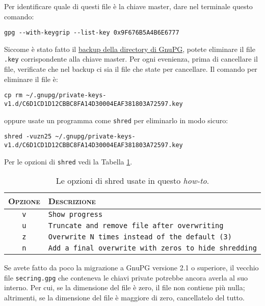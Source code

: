 \documentclass[a4paper,10pt]{article}
\begin{document}
Per identificare quale di questi file è la chiave master, dare nel terminale questo comando:

\begin{lstlisting}
gpg --with-keygrip --list-key 0x9F676B5A4B6E6777
\end{lstlisting}

Siccome è stato fatto il \hyperref[sec:backup-directory-gnupg]{backup della directory di GnuPG}, potete eliminare il file \texttt{.key} corrispondente alla chiave master. Per ogni evenienza, prima di cancellare il file, verificate che nel backup ci sia il file che state per cancellare. Il comando per eliminare il file è:

\begin{lstlisting}
cp rm ~/.gnupg/private-keys-v1.d/C6D1CD1D12CBBC8FA14D30004EAF381803A72597.key
\end{lstlisting}

oppure usate un programma come \texttt{shred} per eliminarlo in modo sicuro:

\begin{lstlisting}
shred -vuzn25 ~/.gnupg/private-keys-v1.d/C6D1CD1D12CBBC8FA14D30004EAF381803A72597.key
\end{lstlisting}

Per le opzioni di \texttt{shred} vedi la Tabella \ref{table:shred}.

\begin{table}[ht!]
	\begin{tabular}{cl}
 		\hline
		\textsc{Opzione} & \textsc{Descrizione} \\
		\hline
		\texttt{v} & \texttt{Show progress} \\
		\texttt{u} & \texttt{Truncate and remove file after overwriting} \\
		\texttt{z} & \texttt{Overwrite N times instead of the default (3)} \\
		\texttt{n} & \texttt{Add a final overwrite with zeros to hide shredding} \\
		\hline
	\end{tabular}
	\caption{Le opzioni di shred usate in questo \textit{how-to}.}
	\label{table:shred}
\end{table}

Se avete fatto da poco la migrazione a GnuPG versione 2.1 o superiore, il vecchio file \texttt{secring.gpg} che conteneva le chiavi private potrebbe ancora averla al suo interno. Per cui, se la dimensione del file è zero, il file non contiene più nulla; altrimenti, se la dimensione del file è maggiore di zero, cancellatelo del tutto.
\end{document}
